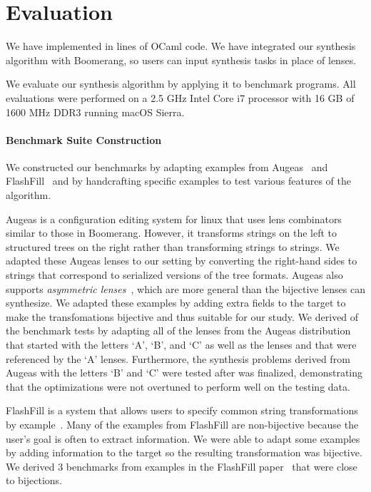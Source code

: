 \documentclass[acmsmall]{acmart}
\begin{document}


\section{Evaluation}
\label{evaluation}

We have implemented \Optician{} in  lines
of OCaml code.  We have integrated our synthesis algorithm with Boomerang, so
users can input synthesis tasks in place of lenses.

We evaluate our synthesis algorithm by applying it to 
benchmark programs.
All evaluations were performed on a 2.5 GHz Intel Core i7 processor with 16 GB
of 1600 MHz DDR3 running macOS Sierra.

\paragraph*{Benchmark Suite Construction}
We constructed our benchmarks by adapting examples from
Augeas~\cite{augeas} and 
FlashFill~\cite{gulwani-popl-2014} and by handcrafting specific
examples to test various 
features of the algorithm.

Augeas is a configuration editing system for linux that uses lens
combinators similar to those in Boomerang. However, it transforms
strings on the left to structured trees on the right rather than
transforming strings to strings.
We adapted these Augeas lenses to our setting by converting the
right-hand sides to strings that correspond to serialized versions
of the tree formats.  
Augeas also supports {\em asymmetric lenses}~\cite{Focal2005-long},
which are more general than the bijective lenses \Optician{} can synthesize.
We adapted these examples by adding extra fields to the
target to make the transfomations bijective and thus suitable
for our study.
We derived  of the benchmark tests by
adapting all of the lenses from the Augeas distribution that started
with the letters `A', `B', and `C' as well as the lenses
 and  that were referenced
by the `A' lenses.
Furthermore, the synthesis problems derived
from Augeas with the letters `B' and `C' were tested after \Optician was
finalized, demonstrating that the optimizations were not
overtuned to perform well on the testing data.

FlashFill is a system that allows users to specify common string
transformations by example~\cite{gulwani-popl-2014}.  
Many of the examples from FlashFill are non-bijective because
the user's goal is often to extract information.  We were able to
adapt some examples by adding information to the target so the
resulting transformation was bijective.
We derived 3 benchmarks from examples in the
FlashFill paper~\cite{gulwani-popl-2014} that were close to bijections.
\end{document}
